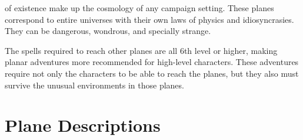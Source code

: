 {}
{}

 of existence make up the cosmology of any campaign setting. These planes correspond to entire universes with their own laws of physics and idiosyncrasies. They can be dangerous, wondrous, and specially strange.

The spells required to reach other planes are all 6th level or higher, making planar adventures more recommended for high-level characters. These adventures require not only the characters to be able to reach the planes, but they also must survive the unusual environments in those planes.






\section{Plane Descriptions}



